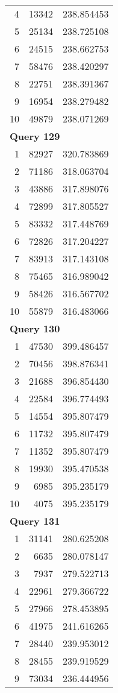 \begin{longtable}[{p}]{@{}rrp{}@{}}
4 & 13342 & 238.854453 \\
5 & 25134 & 238.725108 \\
6 & 24515 & 238.662753 \\
7 & 58476 & 238.420297 \\
8 & 22751 & 238.391367 \\
9 & 16954 & 238.279482 \\
10 & 49879 & 238.071269 \\
\midrule
\multicolumn{3}{l}{\bfseries Query 129} \\
1 & 82927 & 320.783869 \\
2 & 71186 & 318.063704 \\
3 & 43886 & 317.898076 \\
4 & 72899 & 317.805527 \\
5 & 83332 & 317.448769 \\
6 & 72826 & 317.204227 \\
7 & 83913 & 317.143108 \\
8 & 75465 & 316.989042 \\
9 & 58426 & 316.567702 \\
10 & 55879 & 316.483066 \\
\midrule
\multicolumn{3}{l}{\bfseries Query 130} \\
1 & 47530 & 399.486457 \\
2 & 70456 & 398.876341 \\
3 & 21688 & 396.854430 \\
4 & 22584 & 396.774493 \\
5 & 14554 & 395.807479 \\
6 & 11732 & 395.807479 \\
7 & 11352 & 395.807479 \\
8 & 19930 & 395.470538 \\
9 & 6985 & 395.235179 \\
10 & 4075 & 395.235179 \\
\midrule
\multicolumn{3}{l}{\bfseries Query 131} \\
1 & 31141 & 280.625208 \\
2 & 6635 & 280.078147 \\
3 & 7937 & 279.522713 \\
4 & 22961 & 279.366722 \\
5 & 27966 & 278.453895 \\
6 & 41975 & 241.616265 \\
7 & 28440 & 239.953012 \\
8 & 28455 & 239.919529 \\
9 & 73034 & 236.444956 \\

\end{longtable}
